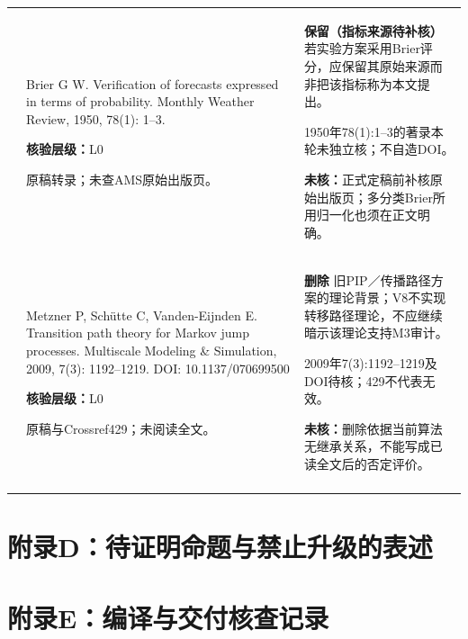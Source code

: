 \begin{longtable}{@{}>{\raggedright\arraybackslash}p{0.7cm}>{\raggedright\arraybackslash}p{7.0cm}>{\raggedright\arraybackslash}p{7.8cm}@{}}
34 & Brier G W. Verification of forecasts expressed in terms of probability. Monthly Weather Review, 1950, 78(1): 1–3.\par\textbf{核验层级：}L0\par 原稿转录；未查AMS原始出版页。 & \textbf{保留（指标来源待补核）} 若实验方案采用Brier评分，应保留其原始来源而非把该指标称为本文提出。\par 1950年78(1):1–3的著录本轮未独立核；不自造DOI。\par\textbf{未核：}正式定稿前补核原始出版页；多分类Brier所用归一化也须在正文明确。 \\\addlinespace[6pt]
35 & Metzner P, Schütte C, Vanden-Eijnden E. Transition path theory for Markov jump processes. Multiscale Modeling \& Simulation, 2009, 7(3): 1192–1219. DOI: 10.1137/070699500\par\textbf{核验层级：}L0\par 原稿与Crossref429；未阅读全文。 & \textbf{删除} 旧PIP／传播路径方案的理论背景；V8不实现转移路径理论，不应继续暗示该理论支持M3审计。\par 2009年7(3):1192–1219及DOI待核；429不代表无效。\par\textbf{未核：}删除依据当前算法无继承关系，不能写成已读全文后的否定评价。 \\\addlinespace[6pt]
\end{longtable}
\endgroup

\clearpage\section{附录D：待证明命题与禁止升级的表述}

\clearpage\section{附录E：编译与交付核查记录}
